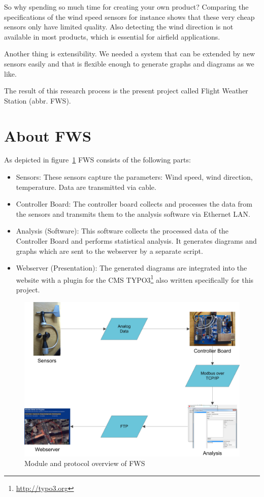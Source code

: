 So why spending so much time for creating your own product? Comparing the specifications of the wind speed sensors for instance shows that these very cheap sensors only have limited quality. Also detecting the wind direction is not available in most products, which is essential for airfield applications.

Another thing is extensibility. We needed a system that can be extended by new sensors easily and that is flexible enough to generate graphs and diagrams as we like.

The result of this research process is the present project called Flight Weather Station (abbr. FWS).

\section{About FWS} %
\label{sec:about_fws}

As depicted in figure~\ref{fig:fws_overview} FWS consists of the following parts:
\begin{itemize}
\item Sensors: These sensors capture the parameters: Wind speed, wind direction, temperature. Data are transmitted via cable.
\item Controller Board: The controller board collects and processes the data from the sensors and transmits them to the analysis software via Ethernet LAN.
\item Analysis (Software): This software collects the processed data of the Controller Board and performs statistical analysis. It generates diagrams and graphs which are sent to the webserver by a separate script.
\item Webserver (Presentation): The generated diagrams are integrated into the website with a plugin for the CMS TYPO3\footnote{\url{http://typo3.org}} also written specifically for this project.
\end{itemize}

\begin{figure}[ht]
    \centering
    \includegraphics[width=\linewidth]{graphics/overview.jpg}
    \caption{Module and protocol overview of FWS}
    \label{fig:fws_overview}
\end{figure}

